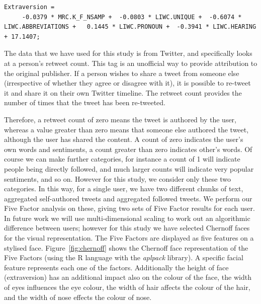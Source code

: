 \documentclass{llncs}
\begin{document}
\begin{lstlisting}[caption={Equation relating to extraversion psychological trait, based on MRC and LIWC
  psycholinguistic features.},frame=none,basicstyle=\ttfamily\footnotesize,label=lst:mrcliwc]
  Extraversion =
     -0.0379 * MRC.K_F_NSAMP +  -0.0803 * LIWC.UNIQUE +  -0.6074 *  LIWC.ABBREVIATIONS +   0.1445 * LIWC.PRONOUN +  -0.3941 * LIWC.HEARING + 17.1407;
\end{lstlisting}

The data that we have used for this study is from Twitter, and specifically looks at a person's
retweet count. This tag is an unofficial way to provide
attribution to the original publisher. If a person wishes to share a tweet
from someone else (irrespective of whether they agree or disagree with
it), it is possible to re-tweet it and share it on their own Twitter
timeline. The retweet count provides the number of times
that the tweet has been re-tweeted.

Therefore, a retweet count of zero means the tweet is authored by the
user, whereas a value greater than zero means that someone else
authored the tweet, although the user has shared the content. A count
of zero indicates the user's own words and sentiments, a count greater
than zero indicates other's words. Of course we can make further
categories, for instance a count of 1 will indicate people being
directly followed, and much larger counts will indicate very popular
sentiments, and so on. However for this study, we consider only these
two categories. In this way, for a single user, we have two different
chunks of text, aggregated self-authored tweets and aggregated
followed tweets. We perform our Five Factor analysis on these, giving
two sets of Five Factor results for each user. In future work we will
use multi-dimensional scaling to work out an algorithmic difference
between users; however for this study we have selected Chernoff
faces~\cite{chernoff:1973} for the visual representation. The Five
Factors are displayed as five features on a stylised
face. Figure~\ref{fig:chernoff} shows the Chernoff face representation
of the Five Factors (using the R language with the {\emph{aplpack}}
library). A specific facial feature represents each one of the
factors. Additionally the height of face (extraversion) has an
additional impact also on the colour of the face, the width of eyes
influences the eye colour, the width of hair affects the colour of the
hair, and the width of nose effects the colour of nose.
\end{document}
